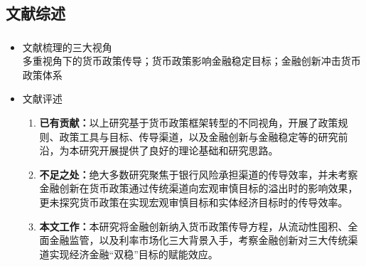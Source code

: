 \documentclass[12pt,aspectratio=169]{ctexbeamer}
\begin{document}
			\subsection{文献综述}
			\begin{frame}[label=lr]
				\frametitle{}
				\begin{itemize}
					\item 文献梳理的三大视角\\
					\normalsize 多重视角下的货币政策传导；货币政策影响金融稳定目标；金融创新冲击货币政策体系
					\item \large 文献评述
					\hyperlink{pr}{\beamergotobutton{}}
					\begin{enumerate}
						\justifying
						\item \textbf{已有贡献：}以上研究基于货币政策框架转型的不同视角，开展了政策规则、政策工具与目标、传导渠道，以及金融创新与金融稳定等的研究前沿，为本研究开展提供了良好的理论基础和研究思路。
						\item \textbf{不足之处：}绝大多数研究聚焦于银行风险承担渠道的传导效率，并未考察金融创新在货币政策通过传统渠道向宏观审慎目标的溢出时的影响效果，更未探究货币政策在实现宏观审慎目标和实体经济目标时的传导效率。
						\item \textbf{本文工作：}本研究将金融创新纳入货币政策传导方程，从流动性囤积、全面金融监管，以及利率市场化三大背景入手，考察金融创新对三大传统渠道实现经济金融“双稳”目标的赋能效应。
					\end{enumerate}
				\end{itemize}
			\end{frame}
			
\end{document}
